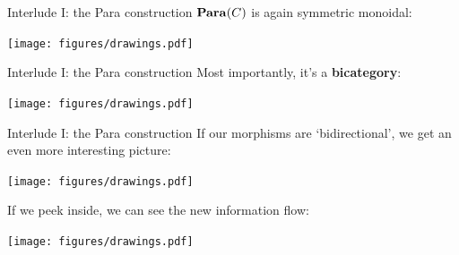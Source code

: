 \begin{frame}{Interlude I: the Para construction}
	$\mathbf{Para}(C)$ is again symmetric monoidal:

	\vfill
	\begin{center}
		\texttt{[image: figures/drawings.pdf]}
	\end{center}
\end{frame}

\begin{frame}{Interlude I: the Para construction}
	Most importantly, it's a \textbf{bicategory}:

	\begin{center}
		\texttt{[image: figures/drawings.pdf]}
	\end{center}
\end{frame}

\begin{frame}{Interlude I: the Para construction}
	If our morphisms are `bidirectional', we get an even more interesting picture:

	\begin{center}
		\texttt{[image: figures/drawings.pdf]}
	\end{center}

	If we peek inside, we can see the new information flow:

	\begin{center}
		\texttt{[image: figures/drawings.pdf]}
	\end{center}
\end{frame}





